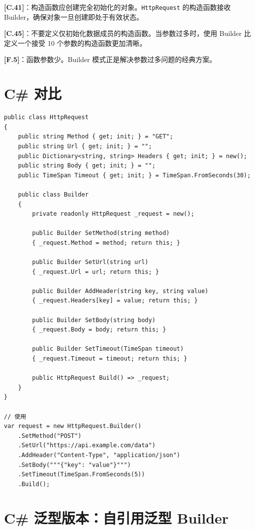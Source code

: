 \documentclass[12pt,a4paper,fontset=fandol]{ctexbook}
\newcommand{\guideref}[1]{\textbf{\textcolor{blue!70!black}{[#1]}}}
\begin{document}
\begin{guideline}
\guideref{C.41}：构造函数应创建完全初始化的对象。\texttt{HttpRequest} 的构造函数接收 Builder，确保对象一旦创建即处于有效状态。

\guideref{C.45}：不要定义仅初始化数据成员的构造函数。当参数过多时，使用 Builder 比定义一个接受 10 个参数的构造函数更加清晰。

\guideref{F.5}：函数参数少。Builder 模式正是解决参数过多问题的经典方案。
\end{guideline}

\section{C\# 对比}

\begin{lstlisting}[style=csharpstyle, caption={建造者模式 --- C\# 实现}]
public class HttpRequest
{
    public string Method { get; init; } = "GET";
    public string Url { get; init; } = "";
    public Dictionary<string, string> Headers { get; init; } = new();
    public string Body { get; init; } = "";
    public TimeSpan Timeout { get; init; } = TimeSpan.FromSeconds(30);

    public class Builder
    {
        private readonly HttpRequest _request = new();

        public Builder SetMethod(string method)
        { _request.Method = method; return this; }

        public Builder SetUrl(string url)
        { _request.Url = url; return this; }

        public Builder AddHeader(string key, string value)
        { _request.Headers[key] = value; return this; }

        public Builder SetBody(string body)
        { _request.Body = body; return this; }

        public Builder SetTimeout(TimeSpan timeout)
        { _request.Timeout = timeout; return this; }

        public HttpRequest Build() => _request;
    }
}

// 使用
var request = new HttpRequest.Builder()
    .SetMethod("POST")
    .SetUrl("https://api.example.com/data")
    .AddHeader("Content-Type", "application/json")
    .SetBody("""{"key": "value"}""")
    .SetTimeout(TimeSpan.FromSeconds(5))
    .Build();
\end{lstlisting}

\section*{C\# 泛型版本：自引用泛型 Builder}
\end{document}

